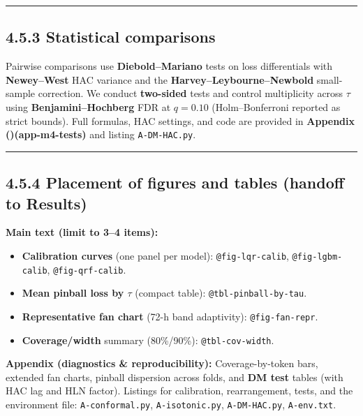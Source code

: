 \documentclass[
  a4paper,
  DIV=11,
  numbers=noendperiod]{scrreprt}
\providecommand{\tightlist}{%
  \setlength{\itemsep}{0pt}\setlength{\parskip}{0pt}}
\begin{document}
\begin{center}\rule{0.5\linewidth}{0.5pt}\end{center}

\subsection{4.5.3 Statistical
comparisons}\label{statistical-comparisons}

Pairwise comparisons use \textbf{Diebold--Mariano} tests on loss
differentials with \textbf{Newey--West} HAC variance and the
\textbf{Harvey--Leybourne--Newbold} small-sample correction. We conduct
\textbf{two-sided} tests and control multiplicity across \(\tau\) using
\textbf{Benjamini--Hochberg} FDR at \(q=0.10\) (Holm--Bonferroni
reported as strict bounds). Full formulas, HAC settings, and code are
provided in \textbf{Appendix
()(app-m4-tests)} and listing
\texttt{A-DM-HAC.py}.

\begin{center}\rule{0.5\linewidth}{0.5pt}\end{center}

\subsection{4.5.4 Placement of figures and tables (handoff to
Results)}\label{placement-of-figures-and-tables-handoff-to-results}

\textbf{Main text (limit to 3--4 items):}

\begin{itemize}
\tightlist
\item
  \textbf{Calibration curves} (one panel per model):
  \texttt{@fig-lqr-calib}, \texttt{@fig-lgbm-calib},
  \texttt{@fig-qrf-calib}.
\item
  \textbf{Mean pinball loss by \(\tau\)} (compact table):
  \texttt{@tbl-pinball-by-tau}.
\item
  \textbf{Representative fan chart} (72-h band adaptivity):
  \texttt{@fig-fan-repr}.
\item
  \textbf{Coverage/width} summary (80\%/90\%): \texttt{@tbl-cov-width}.
\end{itemize}

\textbf{Appendix (diagnostics \& reproducibility):} Coverage-by-token
bars, extended fan charts, pinball dispersion across folds, and
\textbf{DM test} tables (with HAC lag and HLN factor). Listings for
calibration, rearrangement, tests, and the environment file:
\texttt{A-conformal.py}, \texttt{A-isotonic.py}, \texttt{A-DM-HAC.py},
\texttt{A-env.txt}.
\end{document}
